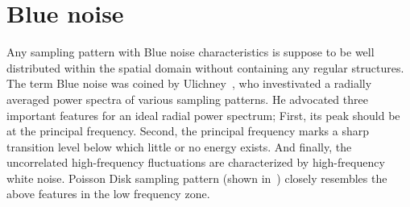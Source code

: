 %
\section{Blue noise}
Any sampling pattern with Blue noise characteristics is suppose to be well distributed within the spatial domain without containing any regular structures. The term Blue noise was coined by Ulichney~\cite{Ulichney:87:halftoning}, 
who investivated a radially averaged power spectra of various sampling patterns. 
He advocated three important features for an ideal radial power spectrum;  
First, its peak should be at the principal frequency. %
Second, the principal frequency marks a sharp transition level below which little or no energy exists. 
And finally, the uncorrelated high-frequency fluctuations are characterized by high-frequency white noise. Poisson Disk sampling pattern (shown in~) closely resembles the above features in the low frequency zone.

